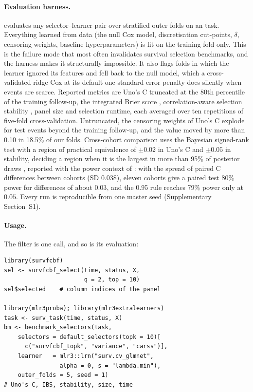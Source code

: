 \paragraph{Evaluation harness.}  evaluates any
selector--learner pair over stratified outer folds on an
 task. Everything learned from
data (the null Cox model, discretisation cut-points, $\delta$, censoring
weights, baseline hyperparameters) is fit on the training fold only. This is
the failure mode that most often invalidates survival selection benchmarks, and
the harness makes it structurally impossible. It also
flags folds in which the learner ignored its features and fell back to the null
model, which a cross-validated ridge Cox at its default one-standard-error
penalty does silently when events are scarce. Reported
metrics are Uno's C \citep{uno2011} truncated at the 80th percentile of the training
follow-up, the integrated Brier score \citep{graf1999}, correlation-aware selection
stability \citep{nogueira2018}, panel size and selection runtime, each averaged over ten
repetitions of five-fold cross-validation. Untruncated, the censoring weights of Uno's C
explode for test events beyond the training follow-up, and the value moved by more than
0.10 in 18.5\% of our folds. Cross-cohort comparison uses the Bayesian
signed-rank test with a region of practical equivalence of $\pm 0.02$ in
Uno's C and $\pm 0.05$ in stability, deciding a region when it is the largest in more
than 95\% of posterior draws \citep{benavoli2017}, reported with the power context of
\citet{boulesteix2017}: with the spread of paired C differences between cohorts (SD
$0.038$), eleven cohorts give a paired test 80\% power for differences of about $0.03$,
and the 0.95 rule reaches 79\% power only at $0.05$. Every run is reproducible from one master seed (Supplementary Section~S1).

\paragraph{Usage.} The filter is one call, and so is its evaluation:

{\small
\begin{verbatim}
library(survfcbf)
sel <- survfcbf_select(time, status, X,
                       q = 2, top = 10)
sel$selected    # column indices of the panel

library(mlr3proba); library(mlr3extralearners)
task <- surv_task(time, status, X)
bm <- benchmark_selectors(task,
    selectors = default_selectors(topk = 10)[
      c("survfcbf_topk", "variance", "carss")],
    learner   = mlr3::lrn("surv.cv_glmnet",
                alpha = 0, s = "lambda.min"),
    outer_folds = 5, seed = 1)
# Uno's C, IBS, stability, size, time
\end{verbatim}
}

